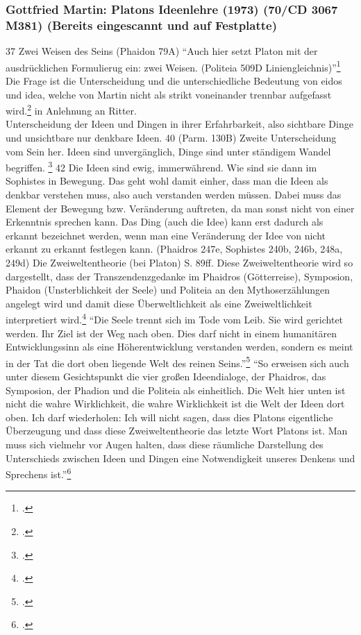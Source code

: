 \documentclass[12pt]{article}
\begin{document}
\subsubsection*{Gottfried Martin: Platons Ideenlehre (1973) (70/CD 3067 M381) (Bereits eingescannt und auf Festplatte)}
37 Zwei Weisen des Seins (Phaidon 79A)
\enquote{Auch hier setzt Platon mit der ausdrücklichen Formulierug ein: zwei Weisen. (Politeia 509D Liniengleichnis)}\footcite[][S. 39]{Martin73}
Die Frage ist die Unterscheidung und die unterschiedliche Bedeutung von eidos und idea, welche von Martin nicht als strikt voneinander trennbar aufgefasst wird.\footcite[vgl.][S. 39]{Martin73} in Anlehnung an Ritter.\\
Unterscheidung der Ideen und Dingen in ihrer Erfahrbarkeit, also sichtbare Dinge und unsichtbare nur denkbare Ideen. 40 (Parm. 130B) Zweite Unterscheidung vom Sein her. Ideen sind unvergänglich, Dinge sind unter ständigem Wandel begriffen. \footcite[vgl.][S. 41]{Martin73}
42 Die Ideen sind ewig, immerwährend. Wie sind sie dann im Sophistes in Bewegung. Das geht wohl damit einher, dass man die Ideen als denkbar verstehen muss, also auch verstanden werden müssen. Dabei muss das Element der Bewegung bzw. Veränderung auftreten, da man sonst nicht von einer Erkenntnis sprechen kann. Das Ding (auch die Idee) kann erst dadurch als erkannt bezeichnet werden, wenn man eine Veränderung der Idee von nicht erkannt zu erkannt festlegen kann. (Phaidros 247e, Sophistes 240b, 246b, 248a, 249d)
Die Zweiweltentheorie (bei Platon) S. 89ff.
Diese Zweiweltentheorie wird so dargestellt, dass der Transzendenzgedanke im Phaidros (Götterreise), Symposion, Phaidon (Unsterblichkeit der Seele) und Politeia an den Mythoserzählungen angelegt wird und damit diese Überweltlichkeit als eine Zweiweltlichkeit interpretiert wird.\footcite[vgl.][S. 88ff.]{Martin73}
\enquote{Die Seele trennt sich im Tode vom Leib. Sie wird gerichtet werden. Ihr Ziel ist der Weg nach oben. Dies darf nicht in einem humanitären Entwicklungssinn als eine Höherentwicklung verstanden werden, sondern es meint in der Tat die dort oben liegende Welt des reinen Seins.}\footcite[][S. 93]{Martin73}
\enquote{So erweisen sich auch unter diesem Gesichtspunkt die vier großen Ideendialoge, der Phaidros, das Symposion, der Phadion und die Politeia als einheitlich. Die Welt hier unten ist nicht die wahre Wirklichkeit, die wahre Wirklichkeit ist die Welt der Ideen dort oben. Ich darf wiederholen: Ich will nicht sagen, dass dies Platons eigentliche Überzeugung und dass diese Zweiweltentheorie das letzte Wort Platons ist. Man muss sich vielmehr vor Augen halten, dass diese räumliche Darstellung des Unterschieds zwischen Ideen und Dingen eine Notwendigkeit unseres Denkens und Sprechens ist.}\footcite[][S. 96]{Martin73}
\end{document}
